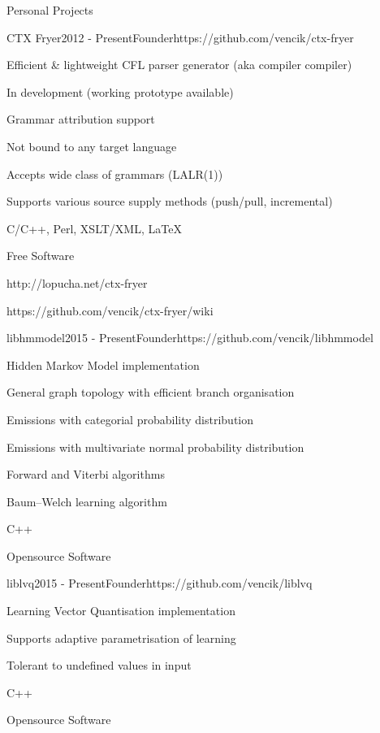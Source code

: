 \documentclass{resume} %
\begin{document}
\begin{rSection}{Personal Projects}


\begin{rSubsection}{CTX Fryer}{2012 - Present}{Founder}{https://github.com/vencik/ctx-fryer}
\item Efficient \& lightweight CFL parser generator (aka compiler compiler)
\item In development (working prototype available)
\item Grammar attribution support
\item Not bound to any target language
\item Accepts wide class of grammars (LALR(1))
\item Supports various source supply methods (push/pull, incremental)
\item C/C++, Perl, XSLT/XML, \LaTeX
\item Free Software
\item http://lopucha.net/ctx-fryer
\item https://github.com/vencik/ctx-fryer/wiki
\end{rSubsection}

\begin{rSubsection}{libhmmodel}{2015 - Present}{Founder}{https://github.com/vencik/libhmmodel}
\item Hidden Markov Model implementation
\item General graph topology with efficient branch organisation
\item Emissions with categorial probability distribution
\item Emissions with multivariate normal probability distribution
\item Forward and Viterbi algorithms
\item Baum--Welch learning algorithm
\item C++
\item Opensource Software
\end{rSubsection}

\begin{rSubsection}{liblvq}{2015 - Present}{Founder}{https://github.com/vencik/liblvq}
\item Learning Vector Quantisation implementation
\item Supports adaptive parametrisation of learning
\item Tolerant to undefined values in input
\item C++
\item Opensource Software
\end{rSubsection}


\end{rSection}
\end{document}
